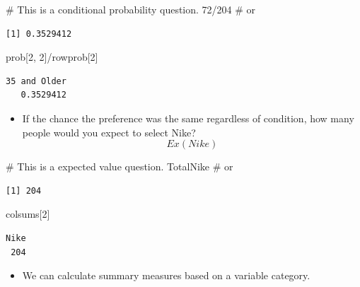 \documentclass[
  letterpaper,
  DIV=11,
  numbers=noendperiod]{scrreprt}
\newenvironment{Shaded}{\begin{snugshade}}{\end{snugshade}}
\newcommand{\CommentTok}[1]{\textcolor[rgb]{0.37,0.37,0.37}{#1}}
\newcommand{\DecValTok}[1]{\textcolor[rgb]{0.68,0.00,0.00}{#1}}
\newcommand{\NormalTok}[1]{\textcolor[rgb]{0.00,0.23,0.31}{#1}}
\newcommand{\SpecialCharTok}[1]{\textcolor[rgb]{0.37,0.37,0.37}{#1}}
\providecommand{\tightlist}{%
  \setlength{\itemsep}{0pt}\setlength{\parskip}{0pt}}\usepackage{longtable,booktabs,array}
\begin{document}
\begin{Shaded}
\begin{Highlighting}[]
\CommentTok{\# This is a conditional probability question.}
\DecValTok{72}\SpecialCharTok{/}\DecValTok{204}  \CommentTok{\# or}
\end{Highlighting}
\end{Shaded}

\begin{verbatim}
[1] 0.3529412
\end{verbatim}

\begin{Shaded}
\begin{Highlighting}[]
\NormalTok{prob[}\DecValTok{2}\NormalTok{, }\DecValTok{2}\NormalTok{]}\SpecialCharTok{/}\NormalTok{rowprob[}\DecValTok{2}\NormalTok{]}
\end{Highlighting}
\end{Shaded}

\begin{verbatim}
35 and Older 
   0.3529412 
\end{verbatim}

\begin{itemize}
\tightlist
\item
  If the chance the preference was the same regardless of condition, how
  many people would you expect to select Nike? \[Ex(Nike)\]
\end{itemize}

\begin{Shaded}
\begin{Highlighting}[]
\CommentTok{\# This is a expected value question.}
\NormalTok{TotalNike  }\CommentTok{\# or}
\end{Highlighting}
\end{Shaded}

\begin{verbatim}
[1] 204
\end{verbatim}

\begin{Shaded}
\begin{Highlighting}[]
\NormalTok{colsums[}\DecValTok{2}\NormalTok{]}
\end{Highlighting}
\end{Shaded}

\begin{verbatim}
Nike 
 204 
\end{verbatim}

\begin{itemize}
\tightlist
\item
  We can calculate summary measures based on a variable category.
\end{itemize}
\end{document}
